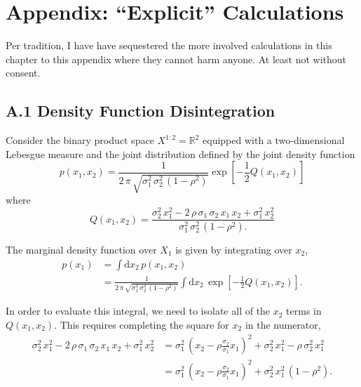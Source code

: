\documentclass[
  letterpaper,
  DIV=11,
  numbers=noendperiod]{scrartcl}
\begin{document}
\section*{Appendix: ``Explicit'' Calculations}\label{sec:appendix}

Per tradition, I have have sequestered the more involved calculations in
this chapter to this appendix where they cannot harm anyone. At least
not without consent.

\subsection*{A.1 Density Function Disintegration}\label{sec:app1}

Consider the binary product space \(X^{1:2} = \mathbb{R}^{2}\) equipped
with a two-dimensional Lebesgue measure and the joint distribution
defined by the joint density function \[
p( x_{1}, x_{2} )
=
\frac{1}{
  2 \, \pi \,
  \sqrt{ \sigma_{1}^{2} \, \sigma_{2}^{2} \, (1 - \rho^{2} ) }
}
\exp \left[
  -\frac{1}{2} Q( x_{1}, x_{2} )
\right]
\] where \[
Q ( x_{1}, x_{2} )
=
\frac{
    \sigma_{2}^{2} \, x_{1}^{2}
  - 2 \, \rho \, \sigma_{1} \, \sigma_{2} \, x_{1} \, x_{2}
  + \sigma_{1}^{2} \, x_{2}^{2}
}{
  \sigma_{1}^{2} \, \sigma_{2}^{2} \, (1 - \rho^{2} ).
}
\]

The marginal density function over \(X_{1}\) is given by integrating
over \(x_{2}\), \begin{align*}
p ( x_{1} )
&=
\int \mathrm{d} x_{2} \,
p( x_{1}, x_{2} )
\\
&=
\frac{1}{
  2 \, \pi \,
  \sqrt{ \sigma_{1}^{2} \, \sigma_{2}^{2} \, (1 - \rho^{2} ) }
}
\int \mathrm{d} x_{2} \,
\exp \left[
  -\frac{1}{2} Q( x_{1}, x_{2} )
\right].
\end{align*}

In order to evaluate this integral, we need to isolate all of the
\(x_{2}\) terms in \(Q ( x_{1}, x_{2} )\). This requires completing the
square for \(x_{2}\) in the numerator, \begin{align*}
\sigma_{2}^{2} \, x_{1}^{2}
  - 2 \, \rho \, \sigma_{1} \, \sigma_{2} \, x_{1} \, x_{2}
  + \sigma_{1}^{2} \, x_{2}^{2}
&=
\sigma_{1}^{2} \,
\left(
  x_{2} - \rho \frac{ \sigma_{2} }{ \sigma_{1} } x_{1}
\right)^{2}
+
\sigma_{2}^{2} \, x_{1}^{2}
- \rho \, \sigma_{2}^{2} \, x_{1}^{2}
\\
&=
\sigma_{1}^{2} \,
\left(
  x_{2} - \rho \frac{ \sigma_{2} }{ \sigma_{1} } x_{1}
\right)^{2}
+
\sigma_{2}^{2} \, x_{1}^{2} \, (1 - \rho^{2} ).
\end{align*}
\end{document}
